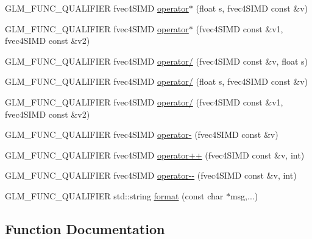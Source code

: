 \begin{DoxyCompactItemize}
\item 
G\+L\+M\+\_\+\+F\+U\+N\+C\+\_\+\+Q\+U\+A\+L\+I\+F\+I\+E\+R fvec4\+S\+I\+M\+D \hyperlink{namespaceglm_1_1detail_a00cbd7d01eca0724ee68cdf04fa55d62}{operator$\ast$} (float s, fvec4\+S\+I\+M\+D const \&v)
\item 
G\+L\+M\+\_\+\+F\+U\+N\+C\+\_\+\+Q\+U\+A\+L\+I\+F\+I\+E\+R fvec4\+S\+I\+M\+D \hyperlink{namespaceglm_1_1detail_ae683c4041ea23fddf34c36b87cbbd319}{operator$\ast$} (fvec4\+S\+I\+M\+D const \&v1, fvec4\+S\+I\+M\+D const \&v2)
\item 
G\+L\+M\+\_\+\+F\+U\+N\+C\+\_\+\+Q\+U\+A\+L\+I\+F\+I\+E\+R fvec4\+S\+I\+M\+D \hyperlink{namespaceglm_1_1detail_af8a63b3b0eb2a7c3f59120bb4e160a76}{operator/} (fvec4\+S\+I\+M\+D const \&v, float s)
\item 
G\+L\+M\+\_\+\+F\+U\+N\+C\+\_\+\+Q\+U\+A\+L\+I\+F\+I\+E\+R fvec4\+S\+I\+M\+D \hyperlink{namespaceglm_1_1detail_ac19446d5d6cc38cac352c5c6b802ab81}{operator/} (float s, fvec4\+S\+I\+M\+D const \&v)
\item 
G\+L\+M\+\_\+\+F\+U\+N\+C\+\_\+\+Q\+U\+A\+L\+I\+F\+I\+E\+R fvec4\+S\+I\+M\+D \hyperlink{namespaceglm_1_1detail_aefac49f641fdbfa4140c9465cf30a625}{operator/} (fvec4\+S\+I\+M\+D const \&v1, fvec4\+S\+I\+M\+D const \&v2)
\item 
G\+L\+M\+\_\+\+F\+U\+N\+C\+\_\+\+Q\+U\+A\+L\+I\+F\+I\+E\+R fvec4\+S\+I\+M\+D \hyperlink{namespaceglm_1_1detail_a0fd34f78cac49e112724c4fc71a4837c}{operator-\/} (fvec4\+S\+I\+M\+D const \&v)
\item 
G\+L\+M\+\_\+\+F\+U\+N\+C\+\_\+\+Q\+U\+A\+L\+I\+F\+I\+E\+R fvec4\+S\+I\+M\+D \hyperlink{namespaceglm_1_1detail_a2434183491dc1c79ecd2860e789978f5}{operator++} (fvec4\+S\+I\+M\+D const \&v, int)
\item 
G\+L\+M\+\_\+\+F\+U\+N\+C\+\_\+\+Q\+U\+A\+L\+I\+F\+I\+E\+R fvec4\+S\+I\+M\+D \hyperlink{namespaceglm_1_1detail_aa03040a975ab9847d84e843caa13ec86}{operator-\/-\/} (fvec4\+S\+I\+M\+D const \&v, int)
\item 
G\+L\+M\+\_\+\+F\+U\+N\+C\+\_\+\+Q\+U\+A\+L\+I\+F\+I\+E\+R std\+::string \hyperlink{namespaceglm_1_1detail_acd5305bbd1c5417b1eb770faf8229d14}{format} (const char $\ast$msg,...)
\end{DoxyCompactItemize}


\subsection{Function Documentation}
\hypertarget{namespaceglm_1_1detail_a39644ee418ae41e3393d1cb6191e32a7}{}

